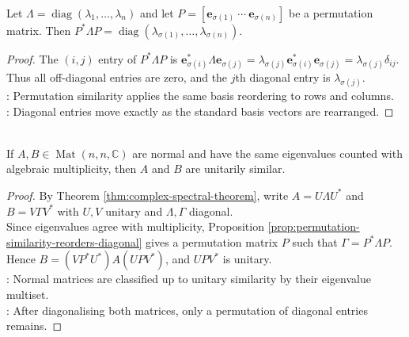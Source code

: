 \begin{proposition} \label{prop:permutation-similarity-reorders-diagonal} \\
Let $\Lambda=\operatorname{diag}(\lambda_1,\ldots,\lambda_n)$ and let $P=[\mathbf{e}_{\sigma(1)}\ \cdots\ \mathbf{e}_{\sigma(n)}]$ be a permutation matrix. Then $P^*\Lambda P=\operatorname{diag}(\lambda_{\sigma(1)},\ldots,\lambda_{\sigma(n)})$.
\begin{proof}
The $(i,j)$ entry of $P^*\Lambda P$ is $\mathbf{e}_{\sigma(i)}^*\Lambda\mathbf{e}_{\sigma(j)} =\lambda_{\sigma(j)}\mathbf{e}_{\sigma(i)}^*\mathbf{e}_{\sigma(j)} =\lambda_{\sigma(j)}\delta_{ij}$.\\
Thus all off-diagonal entries are zero, and the $j$th diagonal entry is $\lambda_{\sigma(j)}$.\\
: Permutation similarity applies the same basis reordering to rows and columns.\\
: Diagonal entries move exactly as the standard basis vectors are rearranged.
\end{proof}
\end{proposition}

\begin{corollary} \label{cor:normal-matrices-same-spectrum-unitarily-similar} \\
If $A,B\in\operatorname{Mat}(n,n,\mathbb{C})$ are normal and have the same eigenvalues counted with algebraic multiplicity, then $A$ and $B$ are unitarily similar.
\begin{proof}
By Theorem \ref{thm:complex-spectral-theorem}, write $A=U\Lambda U^*$ and $B=V\Gamma V^*$ with $U,V$ unitary and $\Lambda,\Gamma$ diagonal.\\
Since eigenvalues agree with multiplicity, Proposition \ref{prop:permutation-similarity-reorders-diagonal} gives a permutation matrix $P$ such that $\Gamma=P^*\Lambda P$.\\
Hence $B=(VP^*U^*)A(UPV^*)$, and $UPV^*$ is unitary.\\
: Normal matrices are classified up to unitary similarity by their eigenvalue multiset.\\
: After diagonalising both matrices, only a permutation of diagonal entries remains.
\end{proof}
\end{corollary}

